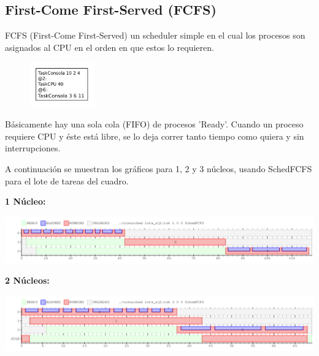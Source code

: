 \subsection{First-Come First-Served (FCFS)}

FCFS (First-Come First-Served) un scheduler simple en el cual los procesos son asignados al CPU en el orden en que estos lo requieren.\newline

\begin{figure}
  \vspace{-30pt}
  \begin{center}
    \includegraphics[width=0.25\textwidth]{./FCFS/FCFS_loteTareas.png}
  \end{center}
   \vspace{-30pt}
\end{figure}

Básicamente hay una sola cola (FIFO) de procesos 'Ready'. 
Cuando un proceso requiere CPU y éste está libre, se lo deja correr tanto tiempo como quiera y sin interrupciones.\newline

A continuación se muestran los gráficos para 1, 2 y 3 núcleos, usando SchedFCFS para el lote de tareas del cuadro.\newline

\vspace{10pt}
\textbf{1 Núcleo:}
\vspace{-20pt}
\begin{center}
 \includegraphics[scale=0.5]{./FCFS/FCFS_1core.png}
\end{center}

\vspace{10pt}

\textbf{2 Núcleos:}
\vspace{-20pt}
\begin{center}
 \includegraphics[scale=0.5]{./FCFS/FCFS_2core.png}
\end{center}

